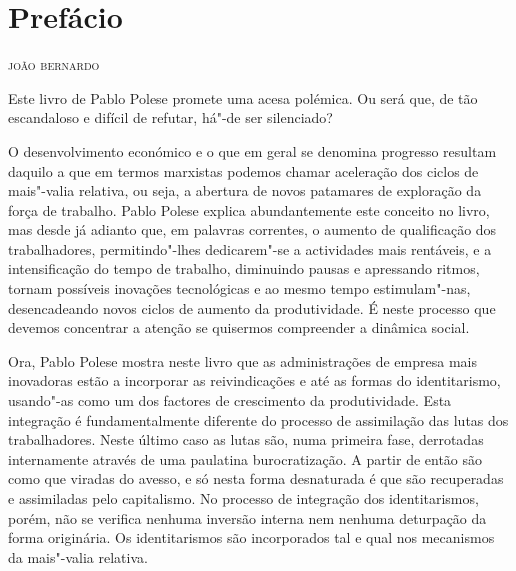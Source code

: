 

\chapter*{Prefácio}

\begin{flushright}
\textsc{joão bernardo}
\end{flushright}

\noindent{}Este livro de Pablo Polese promete uma acesa polémica. Ou será que, de
tão escandaloso e difícil de refutar, há"-de ser silenciado?

O desenvolvimento económico e o que em geral se denomina progresso
resultam daquilo a que em termos marxistas podemos chamar aceleração dos
ciclos de mais"-valia relativa, ou seja, a abertura de novos patamares de
exploração da força de trabalho. Pablo Polese explica abundantemente
este conceito no livro, mas desde já adianto que, em palavras correntes,
o aumento de qualificação dos trabalhadores, permitindo"-lhes
dedicarem"-se a actividades mais rentáveis, e a intensificação do tempo
de trabalho, diminuindo pausas e apressando ritmos, tornam possíveis
inovações tecnológicas e ao mesmo tempo estimulam"-nas, desencadeando
novos ciclos de aumento da produtividade. É neste processo que devemos
concentrar a atenção se quisermos compreender a dinâmica social.

Ora, Pablo Polese mostra neste livro que as administrações de empresa
mais inovadoras estão a incorporar as reivindicações e até as formas do
identitarismo, usando"-as como um dos factores de crescimento da
produtividade. Esta integração é fundamentalmente diferente do processo
de assimilação das lutas dos trabalhadores. Neste último caso as lutas
são, numa primeira fase, derrotadas internamente através de uma
paulatina burocratização. A partir de então são como que viradas do
avesso, e só nesta forma desnaturada é que são recuperadas e assimiladas
pelo capitalismo. No processo de integração dos identitarismos, porém,
não se verifica nenhuma inversão interna nem nenhuma deturpação da forma
originária. Os identitarismos são incorporados tal e qual nos mecanismos
da mais"-valia relativa.

